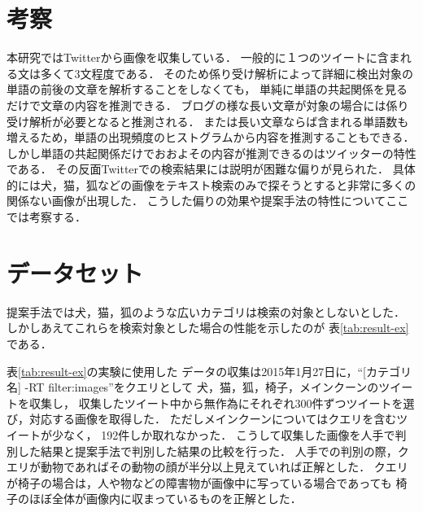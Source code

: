 \documentclass{deimj}
\begin{document}
\section{考察}
\label{sec:examination}

本研究ではTwitterから画像を収集している．
一般的に１つのツイートに含まれる文は多くて3文程度である．
そのため係り受け解析によって詳細に検出対象の単語の前後の文章を解析することをしなくても，
単純に単語の共起関係を見るだけで文章の内容を推測できる．
ブログの様な長い文章が対象の場合には係り受け解析が必要となると推測される．
または長い文章ならば含まれる単語数も増えるため，単語の出現頻度のヒストグラムから内容を推測することもできる．
しかし単語の共起関係だけでおおよその内容が推測できるのはツイッターの特性である．
その反面Twitterでの検索結果には説明が困難な偏りが見られた．
具体的には犬，猫，狐などの画像をテキスト検索のみで探そうとすると非常に多くの関係ない画像が出現した．
こうした偏りの効果や提案手法の特性についてここでは考察する．



\section{データセット}

提案手法では犬，猫，狐のような広いカテゴリは検索の対象としないとした．
しかしあえてこれらを検索対象とした場合の性能を示したのが
表\ref{tab:result-ex}である．

表\ref{tab:result-ex}の実験に使用した
データの収集は2015年1月27日に，“[カテゴリ名] -RT filter:images”をクエリとして
犬，猫，狐，椅子，メインクーンのツイートを収集し，
収集したツイート中から無作為にそれぞれ300件ずつツイートを選び，対応する画像を取得した．
ただしメインクーンについてはクエリを含むツイートが少なく，
192件しか取れなかった．
%
こうして収集した画像を人手で判別した結果と提案手法で判別した結果の比較を行った．
人手での判別の際，クエリが動物であればその動物の顔が半分以上見えていれば正解とした．
クエリが椅子の場合は，人や物などの障害物が画像中に写っている場合であっても
椅子のほぼ全体が画像内に収まっているものを正解とした．
\end{document}

